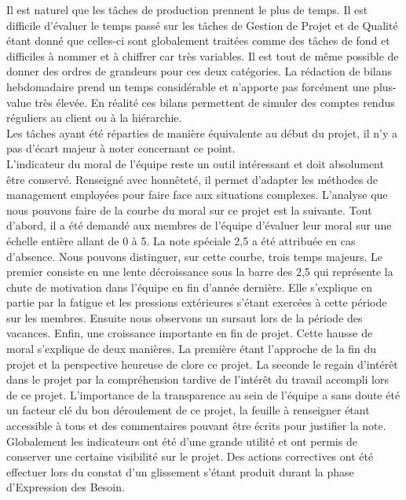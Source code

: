 Il est naturel que les tâches de production prennent le plus de temps. Il est difficile d’évaluer le temps passé sur les tâches de Gestion de Projet et de Qualité étant donné que celles-ci sont globalement traitées comme des tâches de fond et difficiles à nommer et à chiffrer car très variables. Il est tout de même possible de donner des ordres de grandeurs pour ces deux catégories. La rédaction de bilans hebdomadaire prend un temps considérable et n’apporte pas forcément une plus-value très élevée. En réalité ces bilans permettent de simuler des comptes rendus réguliers au client ou à la hiérarchie. \\

Les tâches ayant été réparties de manière équivalente au début du projet, il n’y a pas d’écart majeur à noter concernant ce point.  \\

L’indicateur du moral de l’équipe reste un outil intéressant et doit absolument être conservé. Renseigné avec honnêteté, il permet d’adapter les méthodes de management employées pour faire face aux situations complexes. L’analyse que nous pouvons faire de la courbe du moral sur ce projet est la suivante. Tout d’abord, il a été demandé aux membres de l’équipe d’évaluer leur moral sur une échelle entière allant de 0 à 5. La note spéciale 2,5 a été attribuée en cas d’absence. Nous  pouvons distinguer, sur cette courbe, trois temps majeurs. Le premier consiste en une lente décroissance sous la barre des 2,5 qui représente la chute de motivation dans l’équipe en fin d’année dernière. Elle s’explique en partie par la fatigue et les pressions extérieures s’étant exercées à cette période sur les membres. Ensuite nous observons un sursaut lors de la période des vacances. Enfin, une croissance importante en fin de projet. Cette hausse de moral s’explique de deux manières. La première étant l’approche de la fin du projet et la perspective heureuse de clore ce projet. La seconde le regain d’intérêt dans le projet par la compréhension tardive de l’intérêt du travail accompli lors de ce projet. L’importance de la transparence au sein de l’équipe a sans doute été un facteur clé du bon déroulement de ce projet, la feuille à renseigner étant accessible à tous et des commentaires pouvant être écrits pour justifier la note. \\

Globalement les indicateurs ont été d’une grande utilité et ont permis de conserver une certaine visibilité sur le projet. Des actions correctives ont été effectuer lors du constat d’un glissement s’étant produit durant la phase d’Expression des Besoin. \\